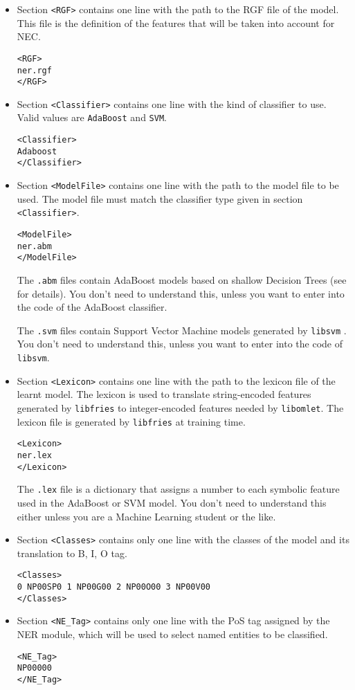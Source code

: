 \documentclass[a4paper]{book}
\begin{document}
\begin{itemize}
  \item Section \verb#<RGF># contains one line with the path to the RGF file of the model. This file is the definition of the features that will be taken into account for NEC.
\begin{verbatim}
<RGF>
ner.rgf
</RGF>
\end{verbatim}

  \item Section \verb#<Classifier># contains one line with the kind of classifier to use. Valid values are
\verb#AdaBoost# and \verb#SVM#.
\begin{verbatim}
<Classifier>
Adaboost
</Classifier>
\end{verbatim}

  \item Section \verb#<ModelFile># contains one line with the path to the model file to be used. The model file must match the classifier type given in section \verb#<Classifier>#.
\begin{verbatim}
<ModelFile>
ner.abm
</ModelFile>
\end{verbatim}
  The {\tt .abm} files contain AdaBoost models based on shallow
  Decision Trees (see \cite{carreras03} for details). You don't need
  to understand this, unless you want to enter into the code of the
  AdaBoost classifier.

  The {\tt .svm} files contain Support Vector Machine models generated
  by {\tt libsvm} \cite{chang11}. You don't need to understand this, unless you want 
  to enter into the code of {\tt libsvm}.


\item Section \verb#<Lexicon># contains one line with the path to the lexicon file of the learnt model. The lexicon is used to translate string-encoded features generated by {\tt libfries} to integer-encoded features needed by {\tt libomlet}. The lexicon file is generated by {\tt libfries} at training time.
\begin{verbatim}
<Lexicon>
ner.lex
</Lexicon>
\end{verbatim}
  The {\tt .lex} file is a dictionary that assigns a number to each
  symbolic feature used in the AdaBoost or SVM model. You don't need to
  understand this either unless you are a Machine Learning student or
  the like.

\item Section \verb#<Classes># contains only one line with the classes of the model and its translation to B, I, O tag.
\begin{verbatim}
<Classes>
0 NP00SP0 1 NP00G00 2 NP00O00 3 NP00V00
</Classes>
\end{verbatim}

  \item Section \verb#<NE_Tag># contains only one line with the PoS tag 
   assigned by the NER module, which will be used to select named entities
   to be classified.
\begin{verbatim}
<NE_Tag>
NP00000
</NE_Tag>
\end{verbatim}

\end{itemize}
\end{document}
